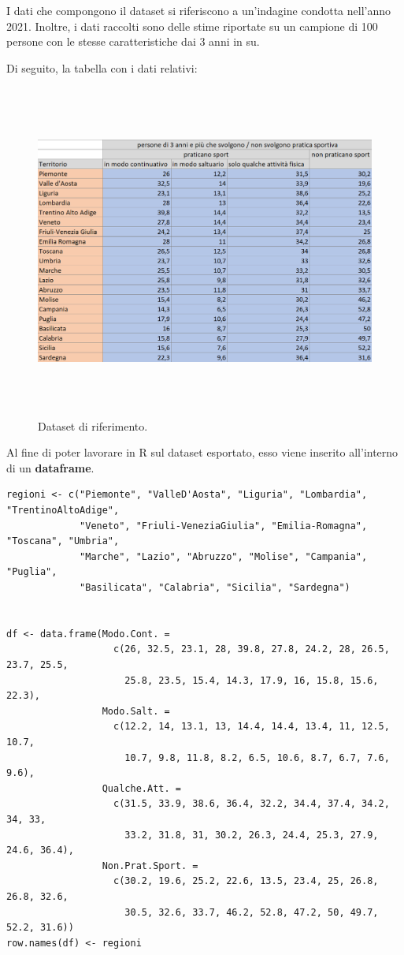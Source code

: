 I dati che compongono il dataset si riferiscono a un'indagine condotta nell'anno 2021. Inoltre, i dati raccolti sono delle stime riportate su un campione di 100 persone con le stesse caratteristiche dai 3 anni in su.

Di seguito, la tabella con i dati relativi:

\begin{figure}[!htb]
    \centering
    \includegraphics[height=11cm]{ProgettoSAD/capitoli/images/dataset_image.png}
    \caption{Dataset di riferimento.}
    \label{fig:dataset_image}
\end{figure}

Al fine di poter lavorare in R sul dataset esportato, esso viene inserito all'interno di un \textbf{dataframe}.

\vspace{5mm}
\begin{lstlisting}
regioni <- c("Piemonte", "ValleD'Aosta", "Liguria", "Lombardia", "TrentinoAltoAdige",
             "Veneto", "Friuli-VeneziaGiulia", "Emilia-Romagna", "Toscana", "Umbria",
             "Marche", "Lazio", "Abruzzo", "Molise", "Campania", "Puglia",
             "Basilicata", "Calabria", "Sicilia", "Sardegna")


df <- data.frame(Modo.Cont. =
                   c(26, 32.5, 23.1, 28, 39.8, 27.8, 24.2, 28, 26.5, 23.7, 25.5,
                     25.8, 23.5, 15.4, 14.3, 17.9, 16, 15.8, 15.6, 22.3),
                 Modo.Salt. =
                   c(12.2, 14, 13.1, 13, 14.4, 14.4, 13.4, 11, 12.5, 10.7,
                     10.7, 9.8, 11.8, 8.2, 6.5, 10.6, 8.7, 6.7, 7.6, 9.6),
                 Qualche.Att. =
                   c(31.5, 33.9, 38.6, 36.4, 32.2, 34.4, 37.4, 34.2, 34, 33,
                     33.2, 31.8, 31, 30.2, 26.3, 24.4, 25.3, 27.9, 24.6, 36.4),
                 Non.Prat.Sport. =
                   c(30.2, 19.6, 25.2, 22.6, 13.5, 23.4, 25, 26.8, 26.8, 32.6,
                     30.5, 32.6, 33.7, 46.2, 52.8, 47.2, 50, 49.7, 52.2, 31.6))
row.names(df) <- regioni
\end{lstlisting}
\vspace{5mm}

